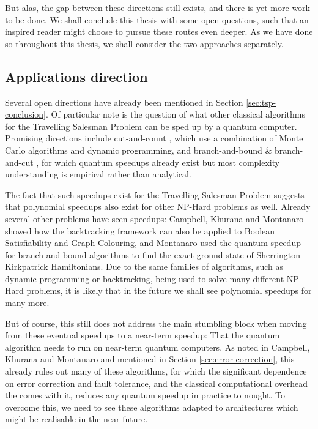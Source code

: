 But alas, the gap between these directions still exists, and there is yet more work to be done. We shall conclude this thesis with some open questions, such that an inspired reader might choose to pursue these routes even deeper. As we have done so throughout this thesis, we shall consider the two approaches separately.

\subsection{Applications direction}

Several open directions have already been mentioned in Section \ref{sec:tsp-conclusion}. Of particular note is the question of what other classical algorithms for the Travelling Salesman Problem can be sped up by a quantum computer. Promising directions include cut-and-count \cite{bjorklund14,bodlaender15,cygan11}, which use a combination of Monte Carlo algorithms and dynamic programming, and branch-and-bound \& branch-and-cut \cite{little1963, padberg1991, applegate2006}, for which quantum speedups already exist but most complexity understanding is empirical rather than analytical.

The fact that such speedups exist for the Travelling Salesman Problem suggests that polynomial speedups also exist for other NP-Hard problems as well. Already several other problems have seen speedups: Campbell, Khurana and Montanaro \cite{campbell2019} showed how the backtracking framework can also be applied to Boolean Satisfiability and Graph Colouring, and Montanaro \cite{montanaro2019} used the quantum speedup for branch-and-bound algorithms to find the exact ground state of Sherrington-Kirkpatrick Hamiltonians. Due to the same families of algorithms, such as dynamic programming or backtracking, being used to solve many different NP-Hard problems, it is likely that in the future we shall see polynomial speedups for many more.

But of course, this still does not address the main stumbling block when moving from these eventual speedups to a near-term speedup: That the quantum algorithm needs to run on near-term quantum computers. As noted in Campbell, Khurana and Montanaro \cite{campbell2019} and mentioned in Section \ref{sec:error-correction}, this already rules out many of these algorithms, for which the significant dependence on error correction and fault tolerance, and the classical computational overhead the comes with it, reduces any quantum speedup in practice to nought. To overcome this, we need to see these algorithms adapted to architectures which might be realisable in the near future.

